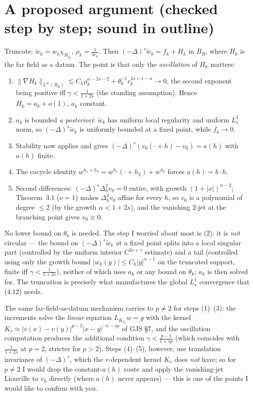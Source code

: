 \documentclass[11pt]{amsart}
\newcommand{\al}{\alpha}
\begin{document}
\section{A proposed argument (checked step by step; sound in outline)}
Truncate: $\tilde w_k=w_k\chi_{B_{\rho_k}}$, $\rho_k=\frac{1}{4r_k}$.
Then $(-\Delta)^s\tilde w_k=f_k+H_k$ in $B_R$, where $H_k$ is the far
field as a datum. The point is that only the \emph{oscillation} of
$H_k$ matters:
\begin{enumerate}
\item $\|\nabla H_k\|_{L^\infty(B_R)}\lesssim
  C_h\rho_k^{\al-2s-2}+\theta_k^{-1}r_k^{2s+1-\al}\to0$, the second
  exponent being positive iff $\gamma<\frac{1}{1+2s}$ (the standing
  assumption). Hence $H_k=a_k+o(1)$, $a_k$ constant.
\item $a_k$ is bounded \emph{a posteriori}: $\tilde w_k$ has uniform
  local regularity and uniform $L^1_s$ norm, so
  $(-\Delta)^s\tilde w_k$ is uniformly bounded at a fixed point, while
  $f_k\to0$.
\item Stability now applies and gives
  $(-\Delta)^s(v_0(\cdot+h)-v_0)=a(h)$ with $a(h)$ finite.
\item The cocycle identity $w^{h_1+h_2}=w^{h_1}(\cdot+h_2)+w^{h_2}$
  forces $a(h)=b\cdot h$.
\item Second differences: $(-\Delta)^s\Delta_h^2v_0=0$ entire, with
  growth $(1+|x|)^{\al-2}$; Theorem~3.1 ($\nu=1$) makes $\Delta_h^2v_0$
  affine for every $h$, so $v_0$ is a polynomial of degree $\le2$ (by
  the growth $\al<1+2s$), and the vanishing $2$-jet at the branching
  point gives $v_0\equiv0$.
\end{enumerate}
No lower bound on $\theta_k$ is needed. The step I worried about most is
(2): it is \emph{not} circular --- the bound on $(-\Delta)^s\tilde w_k$ at
a fixed point splits into a local singular part (controlled by the uniform
interior $C^{2s+\gamma}$ estimate) and a tail (controlled using only the
growth bound $|w_k(y)|\le C_h|y|^{\al-1}$ on the truncated support, finite
iff $\gamma<\frac{1}{1+2s}$), neither of which uses $a_k$ or any bound on
$\theta_k$; $a_k$ is then solved for. The truncation is precisely what
manufactures the global $L^1_s$ convergence that (4.12) needs.

The same far-field-as-datum mechanism carries to $p\neq2$ for steps
(1)--(3): the increments solve the \emph{linear} equation
$L_{K_{v_k}}w=g$ with the kernel
$K_v\simeq|v(x)-v(y)|^{p-2}|x-y|^{-n-sp}$ of GJS \S7, and the oscillation
computation produces the additional condition $\gamma<\frac{p-1}{1+sp}$
(which coincides with $\frac{1}{1+2s}$ at $p=2$, stricter for $p>2$).
Steps (4)--(5), however, use translation invariance of $(-\Delta)^s$,
which the $v$-dependent kernel $K_v$ does \emph{not} have; so for $p\neq2$
I would drop the constant-$a(h)$ route and apply the vanishing-jet
Liouville to $v_0$ directly (where $a(h)$ never appears) --- this is one
of the points I would like to confirm with you.
\end{document}
